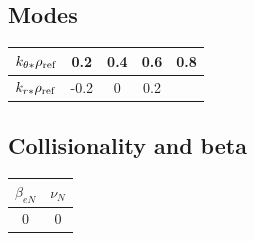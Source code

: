\documentclass[a4paper]{report}
\begin{document}
\subsection{Modes}
\begin{tabular}{c c c c c}
\hline
$k_{\theta*}\rho_{\textrm{ref}}$ & 0.2 & 0.4 & 0.6 & 0.8 \\ [0.5ex]
\hline
$k_{r*}\rho_{\textrm{ref}}$ & -0.2 & 0  & 0.2  &  \\ [0.5ex]
\hline
\end{tabular}

\subsection{Collisionality and beta}
\begin{tabular}{c c}
\hline
 $\beta_{eN}$ & $\nu_N$ \\ [0.5ex]
\hline
0 & 0 \\ [0.5ex]
\hline
\end{tabular}



\end{document}
